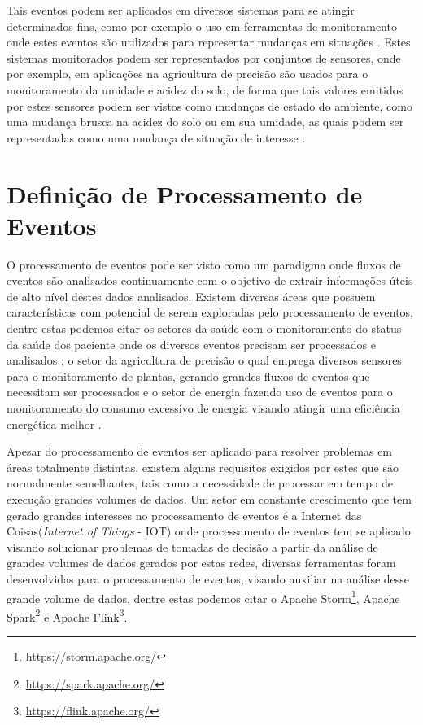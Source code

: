 \documentclass[tid,table]{texufpel} %
\begin{document}
Tais eventos podem ser aplicados em diversos sistemas para se atingir determinados fins, como por exemplo o uso em ferramentas de monitoramento onde estes eventos são utilizados para representar mudanças em situações \cite{etzion2011event}. Estes sistemas monitorados podem ser representados por conjuntos de sensores, onde por exemplo, em aplicações na agricultura de precisão são usados para o monitoramento da umidade e acidez do solo, de forma que tais valores emitidos por estes sensores podem ser vistos como mudanças de estado do ambiente, como uma mudança brusca na acidez do solo ou em sua umidade, as quais podem ser representadas como uma mudança de situação de interesse \cite{garcia2011wireless}.

\section{Definição de Processamento de Eventos}
O processamento de eventos pode ser visto como um paradigma onde fluxos de eventos são analisados continuamente com o objetivo de extrair informações úteis de alto nível destes dados analisados. Existem diversas áreas que possuem características com potencial de serem exploradas pelo processamento de eventos, dentre estas podemos citar os setores da saúde com o monitoramento do status da saúde dos paciente onde os diversos eventos precisam ser processados e analisados \cite{weiner2008health}; o setor da agricultura de precisão o qual emprega diversos sensores para o monitoramento de plantas, gerando grandes fluxos de eventos que necessitam ser processados \cite{garcia2011wireless} e o setor de energia fazendo uso de eventos para o monitoramento do consumo excessivo de energia visando atingir uma eficiência energética melhor \cite{vijayaraghavan2010automated}. 

Apesar do processamento de eventos ser aplicado para resolver problemas em áreas totalmente distintas, existem alguns requisitos exigidos por estes que são normalmente semelhantes, tais como a necessidade de processar em tempo de execução grandes volumes de dados. Um setor em constante  crescimento que tem gerado grandes interesses no processamento de eventos é a Internet das Coisas(\textit{Internet of Things} - IOT) onde processamento de eventos tem se aplicado visando solucionar problemas de tomadas de decisão a partir da análise de grandes volumes de dados gerados por estas redes, diversas ferramentas foram desenvolvidas para o processamento de eventos, visando auxiliar na análise desse grande volume de dados, dentre estas podemos citar o Apache Storm\footnote{\url{https://storm.apache.org/}}, Apache Spark\footnote{\url{https://spark.apache.org/}} e Apache Flink\footnote{\url{https://flink.apache.org/}}.
\end{document}

